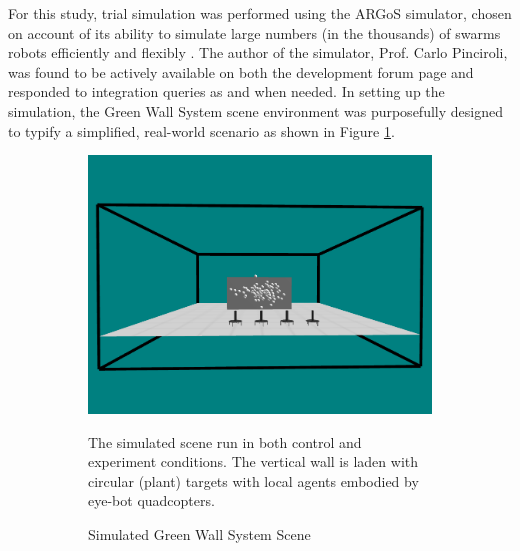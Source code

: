 \documentclass{report}
\begin{document}
For this study, trial simulation was performed using the ARGoS simulator, chosen on account of its ability to simulate large numbers (in the thousands) of swarms robots efficiently and flexibly \cite{Pinciroli2014}. The author of the simulator, Prof. Carlo Pinciroli, was found to be actively available on both the development forum page and responded to integration queries as and when needed. In setting up the simulation, the Green Wall System scene environment was purposefully designed to typify a simplified, real-world scenario as shown in Figure \ref{fig:sim_orig_scene}.

\begin{figure}
	\begin{subfigure}[b]{0.6\textwidth}
		\centering
		\includegraphics[width=\textwidth]{images/vertical_wall_garden_scene}
		\caption{Simulated Green Wall System Scene}
		\label{fig:sim_orig_scene}
		{The simulated scene run in both control and experiment conditions. The vertical wall is laden with circular (plant) targets with local agents embodied by eye-bot quadcopters}.
	\end{subfigure}
	~
	\begin{subfigure}[b]{0.4\textwidth}
		\centering

\end{subfigure}
\end{figure}
\end{document}
